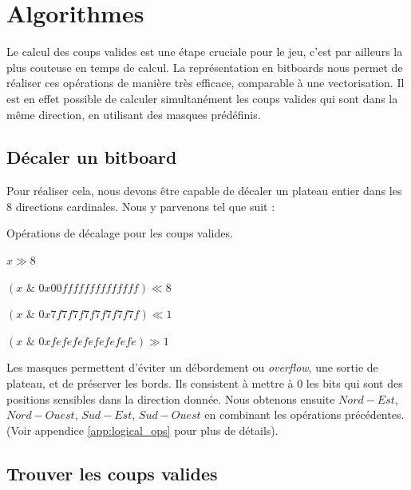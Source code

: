 \section{Algorithmes}
\label{sec:algo}
Le calcul des coups valides est une étape cruciale pour le jeu, c'est par ailleurs la plus couteuse en temps de calcul. La représentation en bitboards nous permet de réaliser ces opérations de manière très efficace, comparable à une vectorisation. Il est en effet possible de calculer simultanément les coups valides qui sont dans la même direction, en utilisant des masques prédéfinis.
\subsection{Décaler un bitboard}
\label{subsec:shift}
Pour réaliser cela, nous devons être capable de décaler un plateau entier dans les 8 directions cardinales. Nous y parvenons tel que suit :
\begin{algorithm}
    \caption{Opérations de décalage pour les coups valides.}
    \begin{algorithmic}[1]
        \State \Return $x \gg 8$
    \EndFunction
    
        \State \Return $(x \,\, \& \,\, 0x00ffffffffffffff) \ll 8$
    \EndFunction
    
        \State \Return $(x \,\, \& \,\, 0x7f7f7f7f7f7f7f7f) \ll 1$
    \EndFunction
    
        \State \Return $(x \,\, \& \,\, 0xfefefefefefefefe) \gg 1$
    \EndFunction
    \end{algorithmic}
    \label{alg:shift_ops}
\end{algorithm}

Les masques permettent d'éviter un débordement ou \textit{overflow}, une sortie de plateau, et de préserver les bords. Ils consistent à mettre à 0 les bits qui sont des positions sensibles dans la direction donnée. Nous obtenons ensuite $Nord-Est$, $Nord-Ouest$, $Sud-Est$, $Sud-Ouest$ en combinant les opérations précédentes. (Voir appendice \ref{app:logical_ops} pour plus de détails).

\subsection{Trouver les coups valides}
\label{subsec:valid_moves}

